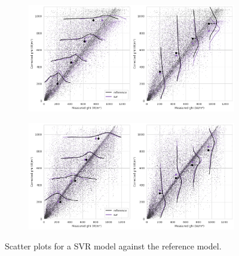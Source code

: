 \begin{figure}\ContinuedFloat
    \begin{subfigure}{\columnwidth}
        \includegraphics[width=\columnwidth]{figures/first_study/scatter_plot_svr_site3_mae.png}
    \end{subfigure}
\medskip
    \begin{subfigure}{\columnwidth}
        \includegraphics[width=\columnwidth]{figures/first_study/scatter_plot_svr_site4_mae.png}
    \end{subfigure}
    \caption[]{Scatter plots for a SVR model against the reference model.}
\end{figure}

